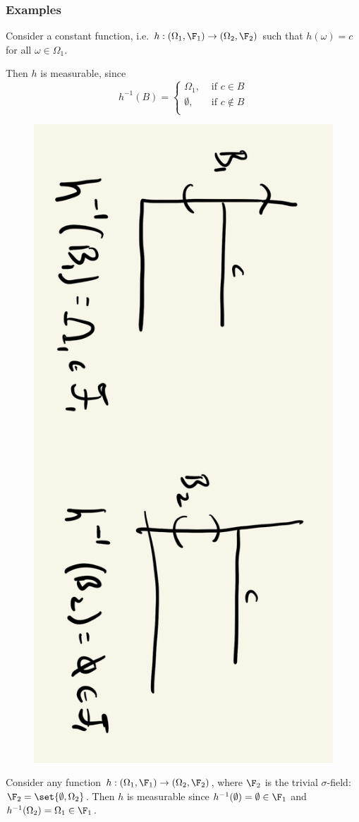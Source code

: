 \documentclass{article} %
\newif\ifActive
\begin{document}
\subsubsection{Examples}

\begin{example}{}
Consider a constant function, i.e. $h: (\Omega_1, \F_1) \to (\Omega_2, \F_2)$ such that $h(\omega) =   c$ for all $\omega \in \Omega_1$.  
\ifActive 
	\textbf{Workshop Exercise:} Show that $h$ is measurable. 
\else 
	Then $h$ is measurable, since 
	\[ h^{-1}(B) = 
	\begin{cases}
	\Omega_1, & \text{ if } c \in B\\ 
	\emptyset, & \text{ if } c \not\in B\\ 
	\end{cases}
	\]
	
	\begin{figure}[H]
	\centering
	\includegraphics[angle=90, width=.5\textwidth]{images/constant_functions_are_measurable}
	\end{figure}
\fi 
\label{ex:constant_functions_are_measurable}
\end{example}

\begin{example}{}
Consider any function $h : (\Omega_1, \F_1) \to (\Omega_2, \F_2)$, where $\F_2$ is the trivial $\sigma$-field: $\F_2 = \set{\emptyset, \Omega_2}$.  Then $h$ is measurable since $h^{-1}(\emptyset) = \emptyset \in \F_1$ and  $h^{-1}(\Omega_2) = \Omega_1 \in \F_1$.
\label{ex:any_function_is_measurable_with_respect_to_trivial_sigma_field}	
\end{example}
\end{document}
